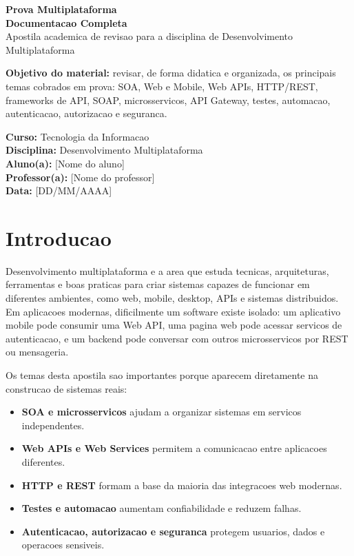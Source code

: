 \documentclass[12pt,a4paper]{article}
\begin{document}
\begin{titlepage}
  \centering
  \vspace*{2.2cm}
  {\Huge\bfseries\color{azulescuro} Prova Multiplataforma}\\[0.35cm]
  {\LARGE\bfseries\color{azul} Documentacao Completa}\\[1cm]
  {\large Apostila academica de revisao para a disciplina de Desenvolvimento Multiplataforma}\\[1.5cm]

  \begin{tcolorbox}[colback=cinza,colframe=azul,width=0.86\textwidth,arc=2mm]
    \textbf{Objetivo do material:} revisar, de forma didatica e organizada, os principais temas cobrados em prova: SOA, Web e Mobile, Web APIs, HTTP/REST, frameworks de API, SOAP, microsservicos, API Gateway, testes, automacao, autenticacao, autorizacao e seguranca.
  \end{tcolorbox}

  \vfill
  \textbf{Curso:} Tecnologia da Informacao\\
  \textbf{Disciplina:} Desenvolvimento Multiplataforma\\
  \textbf{Aluno(a):} [Nome do aluno]\\
  \textbf{Professor(a):} [Nome do professor]\\
  \textbf{Data:} [DD/MM/AAAA]
\end{titlepage}

\tableofcontents
\newpage

\section{Introducao}

Desenvolvimento multiplataforma e a area que estuda tecnicas, arquiteturas, ferramentas e boas praticas para criar sistemas capazes de funcionar em diferentes ambientes, como web, mobile, desktop, APIs e sistemas distribuidos. Em aplicacoes modernas, dificilmente um software existe isolado: um aplicativo mobile pode consumir uma Web API, uma pagina web pode acessar servicos de autenticacao, e um backend pode conversar com outros microsservicos por REST ou mensageria.

Os temas desta apostila sao importantes porque aparecem diretamente na construcao de sistemas reais:

\begin{itemize}
  \item \textbf{SOA e microsservicos} ajudam a organizar sistemas em servicos independentes.
  \item \textbf{Web APIs e Web Services} permitem a comunicacao entre aplicacoes diferentes.
  \item \textbf{HTTP e REST} formam a base da maioria das integracoes web modernas.
  \item \textbf{Testes e automacao} aumentam confiabilidade e reduzem falhas.
  \item \textbf{Autenticacao, autorizacao e seguranca} protegem usuarios, dados e operacoes sensiveis.
\end{itemize}
\end{document}
